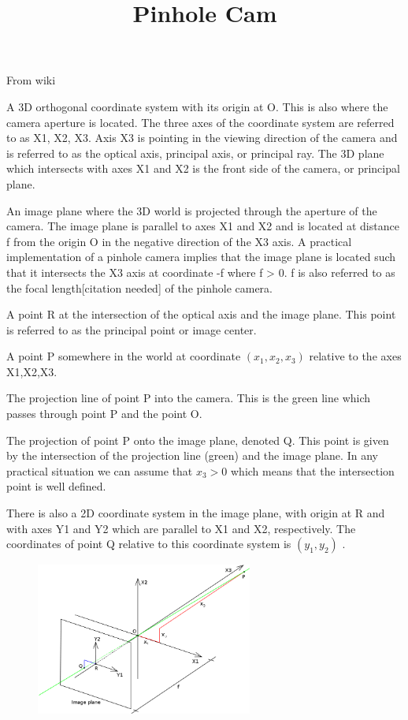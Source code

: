 \documentclass{article}
\title{Pinhole Cam}
\begin{document}
\maketitle
From wiki

\itemize
\item A 3D orthogonal coordinate system with its origin at O. This is also where the camera aperture is located. The three axes of the coordinate system are referred to as X1, X2, X3. Axis X3 is pointing in the viewing direction of the camera and is referred to as the optical axis, principal axis, or principal ray. The 3D plane which intersects with axes X1 and X2 is the front side of the camera, or principal plane.
\item An image plane where the 3D world is projected through the aperture of the camera. The image plane is parallel to axes X1 and X2 and is located at distance  f  from the origin O in the negative direction of the X3 axis. A practical implementation of a pinhole camera implies that the image plane is located such that it intersects the X3 axis at coordinate -f where f > 0. f is also referred to as the focal length[citation needed] of the pinhole camera.
\item A point R at the intersection of the optical axis and the image plane. This point is referred to as the principal point or image center.
\item A point P somewhere in the world at coordinate  $(x_1, x_2, x_3)$  relative to the axes X1,X2,X3.
\item The projection line of point P into the camera. This is the green line which passes through point P and the point O.
\item The projection of point P onto the image plane, denoted Q. This point is given by the intersection of the projection line (green) and the image plane. In any practical situation we can assume that $x_3 > 0$ which means that the intersection point is well defined.
\item There is also a 2D coordinate system in the image plane, with origin at R and with axes Y1 and Y2 which are parallel to X1 and X2, respectively. The coordinates of point Q relative to this coordinate system is  $(y_1, y_2)$ .
\begin{figure}[ht]
    \includegraphics[width=.6\textwidth, height=50mm]{pinholecam.png}
\end{figure}
\end{document}
